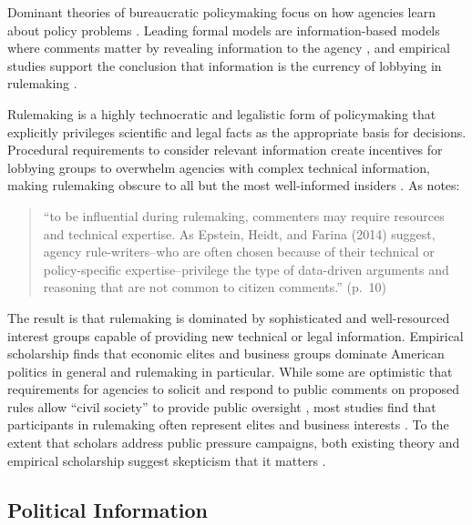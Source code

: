 \documentclass[
      12pt,
        ]{article}
\begin{document}
Dominant theories of bureaucratic policymaking focus on how agencies learn about policy problems \citep{Kerwin2011}. Leading formal models are information-based models where comments matter by revealing information to the agency \citep{Gailmard2017, Libgober2018}, and empirical studies support the conclusion that information is the currency of lobbying in rulemaking \citep{Yackee2012, Cook2017, Gordon2018, Walters2019}.

Rulemaking is a highly technocratic and legalistic form of policymaking that explicitly privileges scientific and legal facts as the appropriate basis for decisions. Procedural requirements to consider relevant information create incentives for lobbying groups to overwhelm agencies with complex technical information, making rulemaking obscure to all but the most well-informed insiders \citep{Wagner2010}.
As \citet{Yackee2019} notes:

\begin{quote}
``to be influential during rulemaking,
commenters may require resources and technical expertise.
As Epstein, Heidt, and Farina (2014) suggest, agency rule-writers--who are often chosen because
of their technical or policy-specific expertise--privilege the type of data-driven
arguments and reasoning that are not common to citizen comments.'' (p.~10)
\end{quote}

The result is that rulemaking is dominated by sophisticated and well-resourced interest groups capable of providing new technical or legal information. Empirical scholarship finds that economic elites and business groups
dominate American politics in general \citetext{\citealp{Jacobs2005}; \citealp{Soss2007}; \citealp[Hertel-Fernandez2019;][]{Hacker2003}; \citealp{Gilens2014}} and rulemaking in
particular. While some are optimistic that requirements for agencies to
solicit and respond to public comments on proposed rules allow ``civil
society'' to provide public oversight \citep{Michaels2015, Metzger2010}, most
studies find that participants in rulemaking often represent elites and
business interests \citep{Seifter2016UCLA, Crow2015, Wagner2011, West2009, Yackee2006JOP, Yackee2006JPART, Golden1998, Haeder2015, Cook2017, LibgoberCarpenter2018}. To the extent that scholars address public pressure campaigns, both
existing theory and empirical scholarship suggest skepticism that it
matters \citep{Balla2018}.

\hypertarget{political-information}{%
\subsection{Political Information}\label{political-information}}
\end{document}
